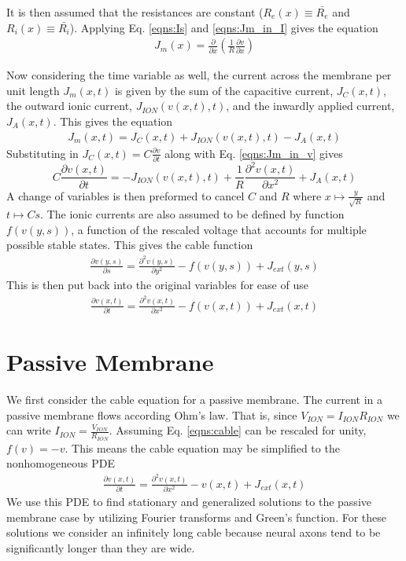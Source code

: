 \documentclass{article}
\begin{document}
 It is then assumed that the resistances are constant ($R_{e}(x) \equiv \bar{R_{e}}$ and $R_{i}(x) \equiv \bar{R_{i}}$). Applying Eq. \ref{eqns:Is} and \ref{eqns:Jm_in_I} gives the equation
 \begin{gather} \label{eqns:Jm_in_v}
     J_{m}(x) = \frac{\partial}{\partial x} \left( \frac{1}{R}\frac{\partial v}{\partial x} \right)
 \end{gather}
 
 Now considering the time variable as well, the current across the membrane per unit length $J_{m}(x,t)$ is given by the sum of the capacitive current, $J_{C}(x,t)$, the outward ionic current, $J_{ION}(v(x,t),t)$, and the inwardly applied current, $J_{A}(x,t)$. This gives the equation
 \begin{gather*}
     J_{m}(x,t) = J_{C}(x,t) + J_{ION}(v(x,t),t) - J_{A}(x,t)
 \end{gather*}
 Substituting in $J_{C}(x,t) = C\frac{\partial v}{\partial t}$ along with Eq. \ref{eqns:Jm_in_v} gives
 \begin{equation*}
     C\frac{\partial v(x,t)}{\partial t} = - J_{ION}(v(x,t),t) + \frac{1}{R}\frac{\partial^2 v(x,t)}{\partial x^2} + J_{A}(x,t)
 \end{equation*}
 A change of variables is then preformed to cancel $C$ and $R$ where $x \mapsto \frac{y}{\sqrt{R}}$ and $t \mapsto Cs$. The ionic currents are also assumed to be defined by function $f(v(y,s))$, a function of the rescaled voltage that accounts for multiple possible stable states. This gives the cable function
 \begin{gather*}
     \frac{\partial v(y,s)}{\partial s} = \frac{\partial^2v(y,s)}{\partial y^2}-f(v(y,s)) + J_{ext}(y,s)
 \end{gather*}
 This is then put back into the original variables for ease of use
 \begin{gather}  \label{eqns:cable}
    \frac{\partial v(x,t)}{\partial t} = \frac{\partial^2v(x,t)}{\partial x^2}-f(v(x,t)) + J_{ext}(x,t)
\end{gather}
 

\section{Passive Membrane}
We first consider the cable equation for a passive membrane. The current in a passive membrane flows according Ohm's law. That is, since $V_{ION} = I_{ION}R_{ION}$ we can write $I_{ION} = \frac{V_{ION}}{R_{ION}}$. Assuming Eq. \ref{eqns:cable} can be rescaled for unity, $f(v) = -v$. This means the cable equation may be simplified to the nonhomogeneous PDE
\begin{gather*}
    \frac{\partial v(x,t)}{\partial t} = \frac{\partial^2v(x,t)}{\partial x^2}-v(x,t) + J_{ext}(x,t)
\end{gather*}
We use this PDE to find stationary and generalized solutions to the passive membrane case by utilizing Fourier transforms and Green's function. For these solutions we consider an infinitely long cable because neural axons tend to be significantly longer than they are wide. 
\end{document}
